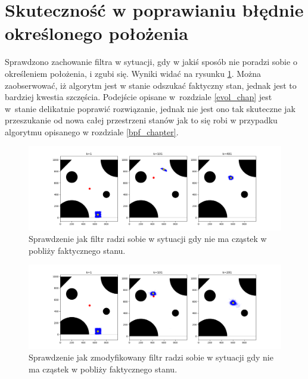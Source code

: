 \section{Skuteczność w poprawianiu błędnie określonego położenia}
Sprawdzono zachowanie filtra w sytuacji, gdy w jakiś sposób nie poradzi sobie o określeniem położenia, i zgubi się. Wyniki widać na rysunku \ref{lost}. Można zaobserwować, iż algorytm jest w stanie odszukać faktyczny stan, jednak jest to bardziej kwestia szczęścia. Podejście opisane w~rozdziale \ref{evol_chap} jest w~stanie delikatnie poprawić rozwiązanie, jednak nie jest ono tak skuteczne jak przeszukanie od nowa całej przestrzeni stanów jak to się robi w przypadku algorytmu opisanego w rozdziale \ref{bpf_chapter}.
\begin{figure}[H]
	\begin{center}
		\includegraphics[width=15cm]{./lost.png}
		\caption{Sprawdzenie jak filtr radzi sobie w sytuacji gdy nie ma cząstek w pobliży faktycznego stanu.}
		\label{lost}
	\end{center}
\end{figure}
\begin{figure}[H]
	\begin{center}
		\includegraphics[width=15cm]{./lost_evol.png}
		\caption{Sprawdzenie jak zmodyfikowany filtr radzi sobie w sytuacji gdy nie ma cząstek w pobliży faktycznego stanu.}
		\label{lost_evol}
	\end{center}
\end{figure}
